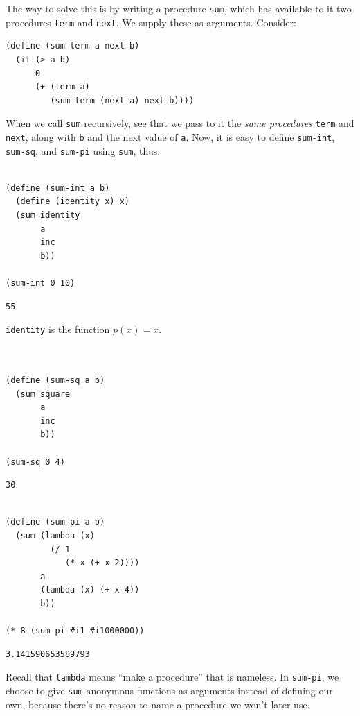 \documentclass[9pt]{report}
\begin{document}
The way to solve this is by writing a procedure \texttt{sum}, which has
available to it two procedures \texttt{term} and \texttt{next}. We supply these
as arguments. Consider:

\begin{verbatim}
(define (sum term a next b)
  (if (> a b)
      0
      (+ (term a)
         (sum term (next a) next b))))
\end{verbatim}

When we call \texttt{sum} recursively, see that we pass to it the \emph{same
procedures} \texttt{term} and \texttt{next}, along with \texttt{b} and the next value of
\texttt{a}. Now, it is easy to define \texttt{sum-int}, \texttt{sum-sq}, and \texttt{sum-pi}
using \texttt{sum}, thus:

\begin{verbatim}

(define (sum-int a b)
  (define (identity x) x)
  (sum identity
       a
       inc
       b))

(sum-int 0 10)
\end{verbatim}

\begin{verbatim}
55
\end{verbatim}


\texttt{identity} is the function \(p(x) = x\).

\begin{verbatim}


(define (sum-sq a b)
  (sum square
       a
       inc
       b))

(sum-sq 0 4)
\end{verbatim}

\begin{verbatim}
30
\end{verbatim}


\begin{verbatim}

(define (sum-pi a b)
  (sum (lambda (x)
         (/ 1
            (* x (+ x 2))))
       a
       (lambda (x) (+ x 4))
       b))

(* 8 (sum-pi #i1 #i1000000))
\end{verbatim}

\begin{verbatim}
3.141590653589793
\end{verbatim}


Recall that \texttt{lambda} means ``make a procedure'' that is nameless. In
\texttt{sum-pi}, we choose to give \texttt{sum} anonymous functions as arguments
instead of defining our own, because there's no reason to name a
procedure we won't later use.
\end{document}

